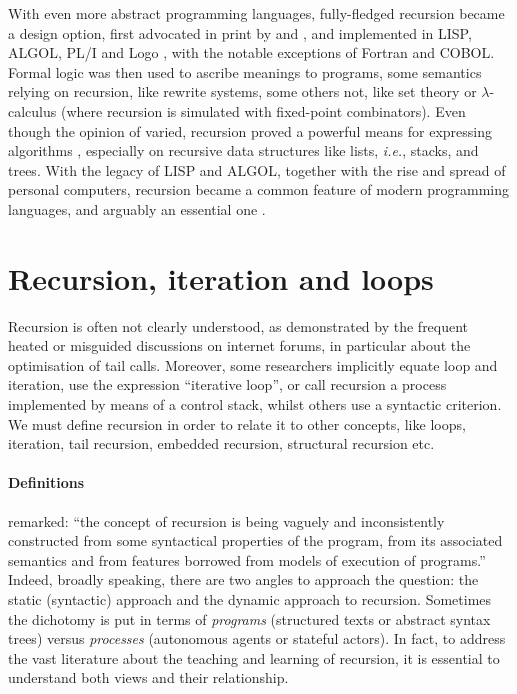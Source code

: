 \documentclass[11pt,a4paper]{article}
\newcommand\plang[1]{\textsf{#1}\xspace}
\begin{document}
With even more abstract programming languages, fully\hyp{}fledged
recursion became a design option, first advocated in print by
\textcite{Dijkstra:1960} and \textcite{McCarthy:1960}, and implemented in
\plang{LISP}, \plang{ALGOL}, \plang{PL/I} and \plang{Logo}
\citep{Martin:1985,Lavallade:1985}, with the notable exceptions of
\plang{Fortran} and \plang{COBOL}. Formal logic was then used to
ascribe meanings to programs, some semantics relying on recursion,
like rewrite systems, some others not, like set theory or
\(\lambda\)-calculus (where recursion is simulated with
fixed\hyp{}point combinators). Even though the opinion of
\textcite{Dijkstra:1974} \citeyearpar{Dijkstra:1975} varied, recursion
proved a powerful means for expressing algorithms
\citep{Dijkstra:1999} \citep{Reingold:2012}, especially on recursive
data structures like lists, \emph{i.e.}, stacks, and trees. With the
legacy of \plang{LISP} and \plang{ALGOL}, together with the rise and
spread of personal computers, recursion became a common feature of
modern programming languages, and arguably an essential one
\citep{Papert:1980,Ford:1982,Astrachan:1994}.

\section{Recursion, iteration and loops}

Recursion is often not clearly understood, as demonstrated by the
frequent heated or misguided discussions on internet forums, in
particular about the optimisation of tail calls. Moreover, some
researchers implicitly equate loop and iteration, use the expression
``iterative loop'', or call recursion a process implemented by means
of a control stack, whilst others use a syntactic criterion. We must
define recursion in order to relate it to other concepts, like loops,
iteration, tail recursion, embedded recursion, structural recursion
etc.

\paragraph{Definitions}
\label{definitions}

\textcite{Giveon:1990} remarked: ``the concept of recursion is being
vaguely and inconsistently constructed from some syntactical
properties of the program, from its associated semantics and from
features borrowed from models of execution of programs.'' Indeed,
broadly speaking, there are two angles to approach the question: the
static (syntactic) approach and the dynamic approach to
recursion. Sometimes the dichotomy is put in terms of \emph{programs}
(structured texts or abstract syntax trees) versus \emph{processes}
(autonomous agents or stateful actors). In fact, to address the vast
literature about the teaching and learning of recursion, it is
essential to understand both views and their relationship.
\end{document}
